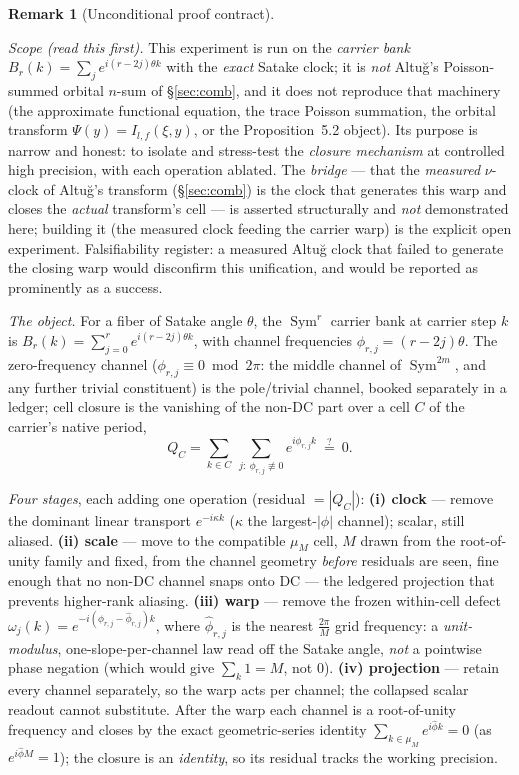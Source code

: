\documentclass[11pt]{article}
\theoremstyle{definition}
\newtheorem{remark}[theorem]{Remark}
\newcommand{\Sym}{\operatorname{Sym}}
\begin{document}
\begin{remark}[Unconditional proof contract]
\begin{enumerate}
\emph{Scope (read this first).} This experiment is run on the \emph{carrier bank}
$B_r(k)=\sum_j e^{i(r-2j)\theta k}$ with the \emph{exact} Satake clock; it is \emph{not} Altu\u{g}'s
Poisson-summed orbital $n$-sum of \S\ref{sec:comb}, and it does not reproduce that machinery (the approximate
functional equation, the trace Poisson summation, the orbital transform $\Psi(y)=I_{l,f}(\xi,y)$, or the
Proposition~5.2 object). Its purpose is narrow and honest: to isolate and stress-test the \emph{closure
mechanism} at controlled high precision, with each operation ablated. The \emph{bridge} --- that the
\emph{measured} $\nu$-clock of Altu\u{g}'s transform (\S\ref{sec:comb}) is the clock that generates this warp
and closes the \emph{actual} transform's cell --- is asserted structurally and \emph{not} demonstrated here;
building it (the measured clock feeding the carrier warp) is the explicit open experiment. Falsifiability
register: a measured Altu\u{g} clock that failed to generate the closing warp would disconfirm this
unification, and would be reported as prominently as a success.

\emph{The object.} For a fiber of Satake angle $\theta$, the $\Sym^r$ carrier bank at carrier step $k$ is
$B_r(k)=\sum_{j=0}^r e^{i(r-2j)\theta k}$, with channel frequencies $\phi_{r,j}=(r-2j)\theta$. The
zero-frequency channel ($\phi_{r,j}\equiv0\bmod2\pi$: the middle channel of $\Sym^{2m}$, and any further
trivial constituent) is the pole/trivial channel, booked separately in a ledger; cell closure is the vanishing
of the non-DC part over a cell $C$ of the carrier's native period,
\[
  Q_C=\sum_{k\in C}\ \sum_{j:\ \phi_{r,j}\not\equiv0} e^{i\phi_{r,j}k}\ \stackrel{?}{=}\ 0 .
\]

\emph{Four stages}, each adding one operation (residual $=|Q_C|$):
\textbf{(i) clock} --- remove the dominant linear transport $e^{-i\kappa k}$ ($\kappa$ the largest-$|\phi|$
channel); scalar, still aliased.
\textbf{(ii) scale} --- move to the compatible $\mu_M$ cell, $M$ drawn from the root-of-unity family and
fixed, from the channel geometry \emph{before} residuals are seen, fine enough that no non-DC channel snaps
onto DC --- the ledgered projection that prevents higher-rank aliasing.
\textbf{(iii) warp} --- remove the frozen within-cell defect $\omega_j(k)=e^{-i(\phi_{r,j}-\hat\phi_{r,j})k}$,
where $\hat\phi_{r,j}$ is the nearest $\tfrac{2\pi}{M}$ grid frequency: a \emph{unit-modulus},
one-slope-per-channel law read off the Satake angle, \emph{not} a pointwise phase negation (which would give
$\sum_k1=M$, not $0$).
\textbf{(iv) projection} --- retain every channel separately, so the warp acts per channel; the collapsed
scalar readout cannot substitute.
After the warp each channel is a root-of-unity frequency and closes by the exact geometric-series identity
$\sum_{k\in\mu_M}e^{i\hat\phi k}=0$ (as $e^{i\hat\phi M}=1$); the closure is an \emph{identity}, so its residual
tracks the working precision.


\end{enumerate}
\end{remark}
\end{document}
